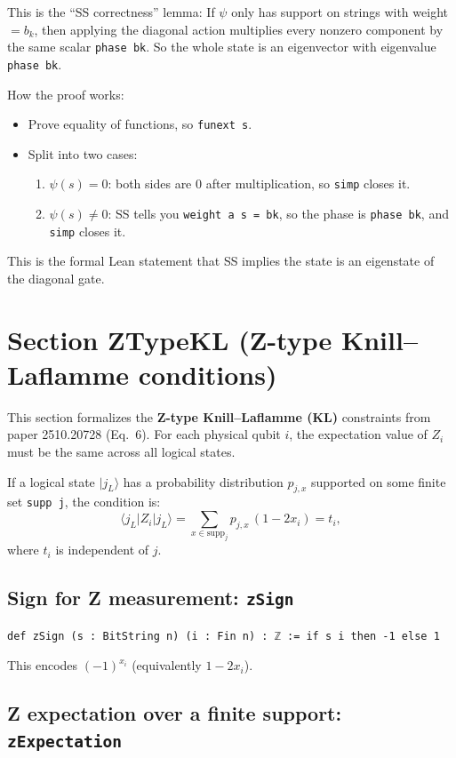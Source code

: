 \documentclass[11pt]{article}
\newcommand{\ket}[1]{\lvert #1 \rangle}
\begin{document}
This is the ``SS correctness'' lemma:
If $\psi$ only has support on strings with weight $=b_k$, then applying the diagonal action multiplies every nonzero component by the same scalar \texttt{phase bk}.
So the whole state is an eigenvector with eigenvalue \texttt{phase bk}.

How the proof works:
\begin{itemize}
\item Prove equality of functions, so \texttt{funext s}.
\item Split into two cases:
\begin{enumerate}
\item $\psi(s)=0$: both sides are $0$ after multiplication, so \texttt{simp} closes it.
\item $\psi(s)\neq 0$: SS tells you \texttt{weight a s = bk}, so the phase is \texttt{phase bk}, and \texttt{simp} closes it.
\end{enumerate}
\end{itemize}

This is the formal Lean statement that SS implies the state is an eigenstate of the diagonal gate.

\section*{Section ZTypeKL (Z-type Knill--Laflamme conditions)}

This section formalizes the \textbf{Z-type Knill--Laflamme (KL)} constraints from paper 2510.20728 (Eq.~6).
For each physical qubit $i$, the expectation value of $Z_i$ must be the same across all logical states.

If a logical state $\ket{j_L}$ has a probability distribution $p_{j,x}$ supported on some finite set \texttt{supp j},
the condition is:
\[
\langle j_L|Z_i|j_L\rangle = \sum_{x \in \text{supp}_j} p_{j,x}\,(1-2x_i) = t_i,
\]
where $t_i$ is independent of $j$.

\subsection*{Sign for Z measurement: \texttt{zSign}}

\begin{lstlisting}
def zSign (s : BitString n) (i : Fin n) : ℤ := if s i then -1 else 1
\end{lstlisting}

This encodes $(-1)^{x_i}$ (equivalently $1-2x_i$).

\subsection*{Z expectation over a finite support: \texttt{zExpectation}}
\end{document}
